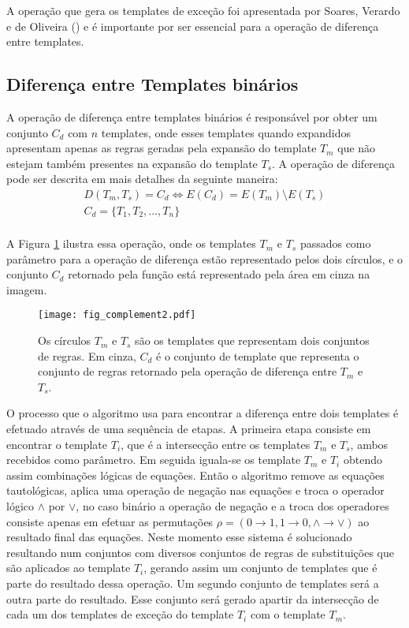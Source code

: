 A operação que gera os templates de exceção foi apresentada por Soares, Verardo e
de Oliveira (\citeyear{soares2016difference}) e é importante por ser essencial para a operação de diferença entre templates.

\subsection{Diferença entre Templates binários}
A operação de diferença entre templates binários é responsável por obter um conjunto $C_d$ com $n$ templates, onde esses templates quando expandidos apresentam apenas as regras geradas pela expansão do template $T_m$ que não estejam também presentes na expansão do template $T_s$. A operação de diferença pode ser descrita em mais detalhes da seguinte maneira:
\begin{equation}
\begin{split}
D(T_m,T_s)= C_d \Leftrightarrow E(C_d) = E(T_m) \setminus E(T_s) \\
C_d = \{T_1,T_2,\dots, T_n\}\\
\end{split}
\end{equation}

A Figura \ref{fig:complement} ilustra essa operação, onde os templates $T_m$ e $T_s$ passados como parâmetro para a operação de diferença estão representado pelos dois círculos, e o conjunto $C_d$ retornado pela função está representado pela área em cinza na imagem.
\begin{figure}[h!]
  \centering
  \texttt{[image: fig\_complement2.pdf]}
  \caption{Os círculos $T_m$ e $T_s$ são os templates que representam dois conjuntos de regras. Em cinza, $C_d$ é o conjunto de template que representa o conjunto de regras retornado pela operação de diferença entre $T_m$ e $T_s$.}
  \label{fig:complement}
\end{figure}    

O processo que o algoritmo usa para encontrar a diferença entre dois templates é efetuado através de uma sequência de etapas. A primeira etapa consiste em encontrar o template $T_i$, que é a intersecção entre os templates $T_m$ e $T_s$, ambos recebidos como parâmetro. Em seguida iguala-se os template $T_m$ e $T_i$ obtendo assim combinações lógicas de equações. Então o algoritmo remove as equações tautológicas, aplica uma operação de negação nas equações e troca o operador lógico $\wedge$ por $\vee$, no caso binário a operação de negação e a troca dos operadores consiste apenas em efetuar as permutações $\rho = (0 \rightarrow 1, 1 \rightarrow 0, \wedge \rightarrow \vee)$ ao resultado final das equações. Neste momento esse sistema é solucionado resultando num conjuntos com diversos conjuntos de regras de substituições que são aplicados ao template $T_i$, gerando assim um conjunto de templates que é parte do resultado dessa operação. Um segundo conjunto de templates será a outra parte do resultado. Esse conjunto será gerado apartir da intersecção de cada um dos templates de exceção do template $T_i$ com o template $T_m$.

